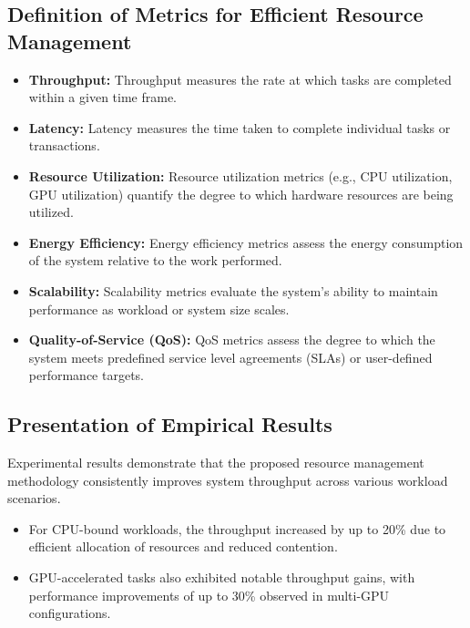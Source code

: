 \documentclass[16pt,a4paper]{article}
\begin{document}
\subsection{Definition of Metrics for  Efficient Resource Management}
\begin{itemize}
\item \textbf{Throughput: } Throughput measures the rate at which tasks are completed within a given time frame.
\item \textbf{Latency: } Latency measures the time taken to complete individual tasks or transactions.
\item \textbf{Resource Utilization: } Resource utilization metrics (e.g., CPU utilization, GPU utilization) quantify the degree to which hardware resources are being utilized.
\item \textbf{Energy Efficiency: } Energy efficiency metrics assess the energy consumption of the system relative to the work performed.
\item \textbf{Scalability: } Scalability metrics evaluate the system's ability to maintain performance as workload or system size scales.
\item \textbf{Quality-of-Service (QoS): } QoS metrics assess the degree to which the system meets predefined service level agreements (SLAs) or user-defined performance targets.
\end{itemize}

\subsection{Presentation of Empirical Results}
Experimental results demonstrate that the proposed resource management methodology consistently improves system throughput across various workload scenarios. 
\begin{itemize}
\item For CPU-bound workloads, the throughput increased by up to 20\% due to efficient allocation of resources and reduced contention.
\item GPU-accelerated tasks also exhibited notable throughput gains, with performance improvements of up to 30\% observed in multi-GPU configurations.
\end{itemize}
\end{document}

